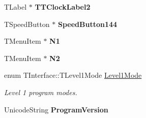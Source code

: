 \begin{DoxyCompactItemize}
\item 
\mbox{\label{class_t_interface_a4ea88dbbf3539f837e0e6eefcc127214}} 
T\+Label $\ast$ {\bfseries T\+T\+Clock\+Label2}
\item 
\mbox{\label{class_t_interface_a67212c07e268f5a78ee5a4fcfe8eaca5}} 
T\+Speed\+Button $\ast$ {\bfseries Speed\+Button144}
\item 
\mbox{\label{class_t_interface_a424b363a104a95f4822dd16de1097ede}} 
T\+Menu\+Item $\ast$ {\bfseries N1}
\item 
\mbox{\label{class_t_interface_aa8e2cca943dae09344c978022b88dd2b}} 
T\+Menu\+Item $\ast$ {\bfseries N2}
\item 
\mbox{\label{class_t_interface_a4144280e4a8af28178c7949976fc67bd}} 
enum T\+Interface\+::\+T\+Level1\+Mode \mbox{\hyperlink{class_t_interface_a4144280e4a8af28178c7949976fc67bd}{Level1\+Mode}}
\begin{DoxyCompactList}\small\item\em Level 1 program modes. \end{DoxyCompactList}\item 
\mbox{\label{class_t_interface_a83d8b6f4fbf587f117e4e166259190d4}} 
Unicode\+String {\bfseries Program\+Version}
\end{DoxyCompactItemize}
